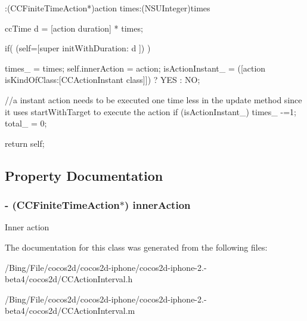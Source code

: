 \begin{DoxyCode}
                    :(CCFiniteTimeAction*)action times:(NSUInteger)times
{
        ccTime d = [action duration] * times;

        if( (self=[super initWithDuration: d ]) ) {
                times_ = times;
                self.innerAction = action;
                isActionInstant_ = ([action isKindOfClass:[CCActionInstant 
      class]]) ? YES : NO;

                //a instant action needs to be executed one time less in the
       update method since it uses startWithTarget to execute the action
                if (isActionInstant_) times_ -=1;
                total_ = 0;
        }
        return self;
}
\end{DoxyCode}


\subsection{Property Documentation}
\hypertarget{interface_c_c_repeat_af145ecadc2068c957ddc9f06e16379c2}{
\subsubsection[{inner\-Action}]{\setlength{\rightskip}{0pt plus 5cm}-\/ ({\bf C\-C\-Finite\-Time\-Action}$\ast$) {\bf inner\-Action}}}\label{interface_c_c_repeat_af145ecadc2068c957ddc9f06e16379c2}
Inner action 

The documentation for this class was generated from the following files\-:\begin{DoxyCompactItemize}
\item 
/\-Bing/\-File/cocos2d/cocos2d-\/iphone/cocos2d-\/iphone-\/2.-\/beta4/cocos2d/C\-C\-Action\-Interval.\-h\item 
/\-Bing/\-File/cocos2d/cocos2d-\/iphone/cocos2d-\/iphone-\/2.-\/beta4/cocos2d/C\-C\-Action\-Interval.\-m\end{DoxyCompactItemize}
